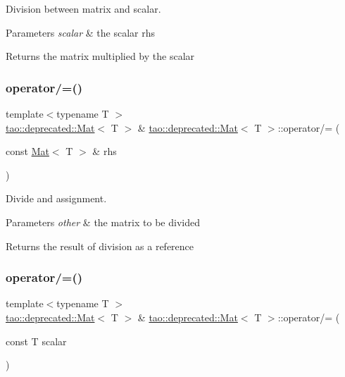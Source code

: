 Division between matrix and scalar. 


\begin{DoxyParams}{Parameters}
{\em scalar} & the scalar rhs \\
\hline
\end{DoxyParams}
\begin{DoxyReturn}{Returns}
the matrix multiplied by the scalar 
\end{DoxyReturn}
\mbox{\label{classtao_1_1deprecated_1_1_mat_ae255f6910884138036e4409d23a2d6f4}} 
\subsubsection{\texorpdfstring{operator/=()}{operator/=()}\hspace{0.1cm}{\footnotesize\ttfamily [1/2]}}
{\footnotesize\ttfamily template$<$typename T $>$ \\
\mbox{\hyperlink{classtao_1_1deprecated_1_1_mat}{tao\+::deprecated\+::\+Mat}}$<$ T $>$ \& \mbox{\hyperlink{classtao_1_1deprecated_1_1_mat}{tao\+::deprecated\+::\+Mat}}$<$ T $>$\+::operator/= (\begin{DoxyParamCaption}\item[{const \mbox{\hyperlink{classtao_1_1deprecated_1_1_mat}{Mat}}$<$ T $>$ \&}]{rhs }\end{DoxyParamCaption})}



Divide and assignment. 


\begin{DoxyParams}{Parameters}
{\em other} & the matrix to be divided \\
\hline
\end{DoxyParams}
\begin{DoxyReturn}{Returns}
the result of division as a reference 
\end{DoxyReturn}
\mbox{\label{classtao_1_1deprecated_1_1_mat_a0f7a98577afc930a74bfd5ee35553eca}} 
\subsubsection{\texorpdfstring{operator/=()}{operator/=()}\hspace{0.1cm}{\footnotesize\ttfamily [2/2]}}
{\footnotesize\ttfamily template$<$typename T $>$ \\
\mbox{\hyperlink{classtao_1_1deprecated_1_1_mat}{tao\+::deprecated\+::\+Mat}}$<$ T $>$ \& \mbox{\hyperlink{classtao_1_1deprecated_1_1_mat}{tao\+::deprecated\+::\+Mat}}$<$ T $>$\+::operator/= (\begin{DoxyParamCaption}\item[{const T}]{scalar }\end{DoxyParamCaption})}



